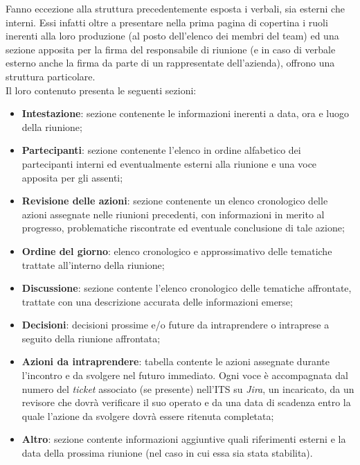 \documentclass[10pt, a4paper]{article}
\begin{document}
    Fanno eccezione alla struttura precedentemente esposta i verbali, sia esterni che interni. Essi infatti oltre a 
    presentare nella prima pagina di copertina i ruoli inerenti alla loro produzione (al posto dell'elenco dei membri del team) ed una 
    sezione apposita per la firma del responsabile di riunione (e in caso di verbale esterno anche la firma da parte di un rappresentate 
    dell'azienda), offrono una struttura particolare.\\
    Il loro contenuto presenta le seguenti sezioni:
    \begin{itemize}
        \item \textbf{Intestazione}: sezione contenente le informazioni inerenti a data, ora e luogo della riunione;
        \item \textbf{Partecipanti}: sezione contenente l'elenco in ordine alfabetico dei partecipanti interni ed eventualmente esterni 
        alla riunione e una voce apposita per gli assenti;
        \item \textbf{Revisione delle azioni}: sezione contenente un elenco cronologico delle azioni assegnate nelle riunioni precedenti, 
        con informazioni in merito al progresso, problematiche riscontrate ed eventuale conclusione di tale azione;
        \item \textbf{Ordine del giorno}: elenco cronologico e approssimativo delle tematiche trattate all'interno della riunione;
        \item \textbf{Discussione}: sezione contente l'elenco cronologico delle tematiche affrontate, trattate con una descrizione accurata 
        delle informazioni emerse;
        \item \textbf{Decisioni}: decisioni prossime e/o future da intraprendere o intraprese a seguito della riunione affrontata;
        \item \textbf{Azioni da intraprendere}: tabella contente le azioni assegnate durante l'incontro e da svolgere nel futuro immediato. 
        Ogni voce è accompagnata dal numero del \textit{ticket} associato (se presente) nell'ITS su \textit{Jira}, un incaricato, da un 
        revisore che dovrà verificare il suo operato e da una data di scadenza entro la quale l'azione da svolgere dovrà essere ritenuta 
        completata;
        \item \textbf{Altro}: sezione contente informazioni aggiuntive quali riferimenti esterni e la data della prossima riunione 
        (nel caso in cui essa sia stata stabilita).
    \end{itemize}    
    
\end{document}
